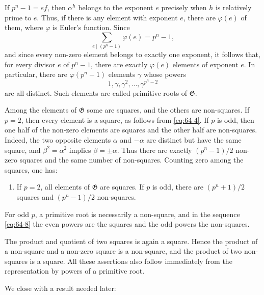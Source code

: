 \documentclass[11pt,a4paper]{article}
\begin{document}
If \(p^n-1=ef\), then \(\alpha^h\) belongs to the exponent \(e\) precisely when \(h\) is relatively prime to \(e\).  Thus, if there is any element with exponent \(e\), there are \(\varphi(e)\) of them, where \(\varphi\) is Euler's function.  Since
\begin{equation}\label{eq:64-6}
 \sum_{e\mid(p^n-1)}\varphi(e)=p^n-1,
\end{equation}
and since every non-zero element belongs to exactly one exponent, it follows that, for every divisor \(e\) of \(p^n-1\), there are exactly \(\varphi(e)\) elements of exponent \(e\).  In particular, there are \(\varphi(p^n-1)\) elements \(\gamma\) whose powers
\begin{equation}\label{eq:64-8}
 1,\gamma,\gamma^2,\ldots,\gamma^{p^n-2}
\end{equation}
are all distinct.  Such elements are called primitive roots of \(\mathfrak G\).

Among the elements of \(\mathfrak G\) some are squares, and the others are non-squares.  If \(p=2\), then every element is a square, as follows from \eqref{eq:64-4}.  If \(p\) is odd, then one half of the non-zero elements are squares and the other half are non-squares.  Indeed, the two opposite elements \(\alpha\) and \(-\alpha\) are distinct but have the same square, and \(\beta^2=\alpha^2\) implies \(\beta=\pm\alpha\).  Thus there are exactly \((p^n-1)/2\) non-zero squares and the same number of non-squares.  Counting zero among the squares, one has:

\begin{enumerate}[label=\arabic*.,resume]
\item If \(p=2\), all elements of \(\mathfrak G\) are squares.  If \(p\) is odd, there are \((p^n+1)/2\) squares and \((p^n-1)/2\) non-squares.
\end{enumerate}
For odd \(p\), a primitive root is necessarily a non-square, and in the sequence \eqref{eq:64-8} the even powers are the squares and the odd powers the non-squares.

The product and quotient of two squares is again a square.  Hence the product of a non-square and a non-zero square is a non-square, and the product of two non-squares is a square.  All these assertions also follow immediately from the representation by powers of a primitive root.

We close with a result needed later:
\end{document}
